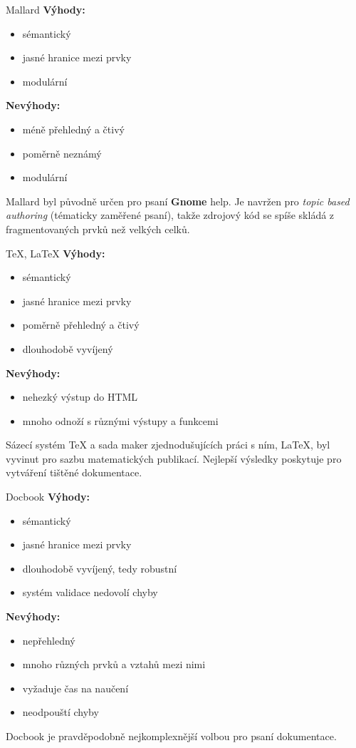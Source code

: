 \documentclass[12pt]{beamer}
\begin{document}
	\begin{frame}{Mallard}
	\textbf{Výhody:}
	\begin{itemize}
		\item sémantický
		\item jasné hranice mezi prvky
		\item modulární
	\end{itemize}	
	\textbf{Nevýhody:}
	\begin{itemize}
		\item méně přehledný a čtivý
		\item poměrně neznámý
		\item modulární
	\end{itemize}				
	Mallard byl původně určen pro psaní \textbf{Gnome} help. Je navržen pro \textit{topic based authoring} (tématicky zaměřené psaní), takže zdrojový kód se spíše skládá z fragmentovaných prvků než velkých celků.
	\end{frame}

	\begin{frame}{\TeX, \LaTeX}
	\textbf{Výhody:}
	\begin{itemize}
		\item sémantický
		\item jasné hranice mezi prvky
		\item poměrně přehledný a čtivý
		\item dlouhodobě vyvíjený
	\end{itemize}	
	\textbf{Nevýhody:}
	\begin{itemize}
		\item nehezký výstup do HTML
		\item mnoho odnoží s různými výstupy a funkcemi
	\end{itemize}				
	Sázecí systém \TeX{} a sada maker zjednodušujících práci s ním, \LaTeX, byl vyvinut pro sazbu matematických publikací. Nejlepší výsledky poskytuje pro vytváření tištěné dokumentace. 
	\end{frame}

	\begin{frame}{Docbook}
	\textbf{Výhody:}
	\begin{itemize}
		\item sémantický
		\item jasné hranice mezi prvky
		\item dlouhodobě vyvíjený, tedy robustní
		\item systém validace nedovolí chyby
	\end{itemize}	
	\textbf{Nevýhody:}
	\begin{itemize}
		\item nepřehledný
		\item mnoho různých prvků a vztahů mezi nimi
		\item vyžaduje čas na naučení
		\item neodpouští chyby
	\end{itemize}				
	Docbook je pravděpodobně nejkomplexnější volbou pro psaní dokumentace.
	\end{frame}
\end{document}
